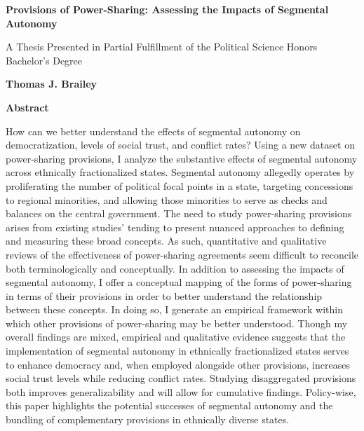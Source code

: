 \documentclass[12pt]{article}
\begin{document}
\begin{titlepage}

\begin{center}
\vspace{1cm}
\LARGE
\textbf{Provisions of Power-Sharing: Assessing the Impacts of Segmental Autonomy}

\large
\vspace{.5cm}

A Thesis Presented in Partial Fulfillment of the Political Science Honors Bachelor's Degree\\

\vspace{.5cm}

\textbf{Thomas J. Brailey}\\

\vspace{.5cm}
\Large
\vspace{.5cm}
\Large

\textbf{Abstract}
\end{center}

How can we better understand the effects of segmental autonomy on democratization, levels of social trust, and conflict rates? Using a new dataset on power-sharing provisions, I analyze the substantive effects of segmental autonomy across ethnically fractionalized states. Segmental autonomy allegedly operates by proliferating the number of political focal points in a state, targeting concessions to regional minorities, and allowing those minorities to serve as checks and balances on the central government. The need to study power-sharing provisions arises from existing studies' tending to present nuanced approaches to defining and measuring these broad concepts. As such, quantitative and qualitative reviews of the effectiveness of power-sharing agreements seem difficult to reconcile both terminologically and conceptually. In addition to assessing the impacts of segmental autonomy, I offer a conceptual mapping of the forms of power-sharing in terms of their provisions in order to better understand the relationship between these concepts. In doing so, I generate an empirical framework within which other provisions of power-sharing may be better understood. Though my overall findings are mixed, empirical and qualitative evidence suggests that the implementation of segmental autonomy in ethnically fractionalized states serves to enhance democracy and, when employed alongside other provisions, increases social trust levels while reducing conflict rates. Studying disaggregated provisions both improves generalizability and will allow for cumulative findings. Policy-wise, this paper highlights the potential successes of segmental autonomy and the bundling of complementary provisions in ethnically diverse states. 


\end{titlepage}
\end{document}
